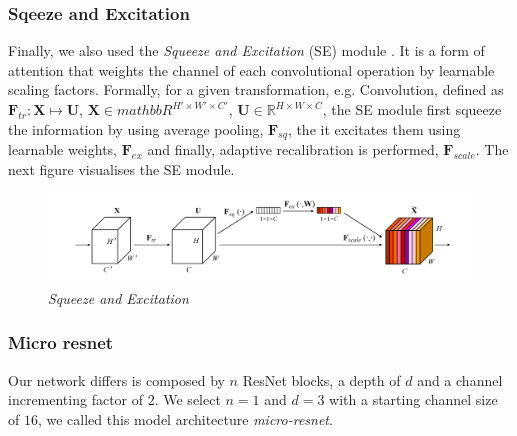 \documentclass[../document.tex]{subfiles}
\begin{document}
\subsubsection{Sqeeze and Excitation}
Finally, we also used the \emph{Squeeze and Excitation} (SE) module \cite{hu2017squeeze}. It is a form of attention that weights the channel of each convolutional operation by learnable scaling factors. Formally, for a given transformation, e.g. Convolution, defined as $\bm{F}_{tr}  : \bm{X} \mapsto \bm{U}$, $\bm{X} \in mathbb{R}^{H' \times W' \times C'}$, $\bm{U} \in \mathbb{R}^{H \times W \times C}$, the SE module first squeeze the information by using average pooling, $\bm{F}_{sq}$, the it excitates them using learnable weights, $\bm{F}_{ex}$ and finally, adaptive recalibration is performed, $\bm{F}_{scale}$.
The next figure visualises the SE module.
\begin{figure}[H]
    \centering
    \includegraphics[width=\linewidth]{../img/implementation/estimator/se.png}
    \caption{\emph{Squeeze and Excitation} \cite{hu2017squeeze}}
\end{figure}
\subsubsection{Micro resnet}
Our network differs is composed by $n$ ResNet blocks, a depth of $d$ and a channel incrementing factor of $2$. We select $n=1$ and $d=3$ with a starting channel size of $16$, we called this model architecture \emph{micro-resnet}. 
\end{document}
